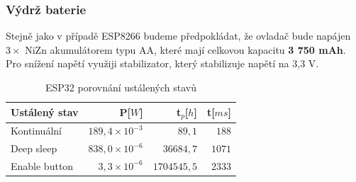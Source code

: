 \documentclass[a4paper, 12pt]{report}
\begin{document}
    \subsubsection{Výdrž baterie}
    Stejně jako v případě ESP8266 budeme předpokládat, že ovladač bude napájen $3 \times$ NiZn akumulátorem typu AA, které mají celkovou kapacitu \textbf{3 750 mAh}. Pro snížení napětí využiji stabilizator, který stabilizuje napětí na 3,3 V\@.

    \begin{table}[h!]
        \centering
        \caption{ESP32 porovnání ustálených stavů}
        \begin{tabular}{||l|r r r||}
            \hline
            Ustálený stav & P[$W$]                 & t$_{p}$[$h$]  & t[$ms$] \\
            \hline
            Kontinuální   & $189,4 \times 10^{-3}$ & $89,1$        & $188$   \\
            Deep sleep    & $838,0 \times 10^{-6}$ & $36 684,7$    & $1 071$   \\
            Enable button & $3,3\times 10^{-6}$    & $1 704 545,5$ & $2 333$ \\
            \hline
        \end{tabular}
        \label{tab:esp32-klidove-rezimy-porovnani}
    \end{table}\par
\end{document}
